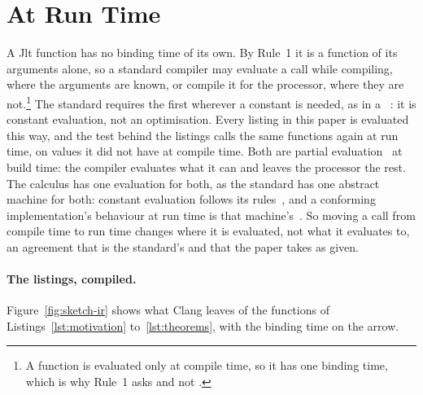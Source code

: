 \section{At Run Time}
\label{sec:binding}

A Jlt function has no binding time of its own.
By Rule~1 it is a  function of its arguments alone, so a standard \Cpp{} compiler may evaluate a call while compiling, where the arguments are known, or compile it for the processor, where they are not.\footnote{A  function is evaluated only at compile time, so it has one binding time, which is why Rule~1 asks  and not .}
The standard requires the first wherever a constant is needed, as in a ~\cite[{\texttt{expr.const}}]{cpp23standard}: it is constant evaluation, not an optimisation.
Every listing in this paper is evaluated this way, and the test behind the listings calls the same functions again at run time, on values it did not have at compile time.
Both are partial evaluation~\cite{jones1993partial} at build time: the compiler evaluates what it can and leaves the processor the rest.
The calculus has one evaluation for both, as the standard has one abstract machine for both: constant evaluation follows its rules~\cite[{\texttt{expr.const}}]{cpp23standard}, and a conforming implementation's behaviour at run time is that machine's~\cite[{\texttt{intro.abstract}}]{cpp23standard}.
So moving a call from compile time to run time changes where it is evaluated, not what it evaluates to, an agreement that is the standard's and that the paper takes as given.

\paragraph{The listings, compiled.}
Figure~\ref{fig:sketch-ir} shows what Clang leaves of the functions of Listings~\ref{lst:motivation} to~\ref{lst:theorems}, with the binding time on the arrow.

